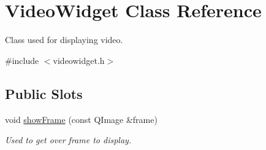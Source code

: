\hypertarget{class_video_widget}{
\section{VideoWidget Class Reference}
\label{db/df7/class_video_widget}
}


Class used for displaying video.  




{\ttfamily \#include $<$videowidget.h$>$}

\subsection*{Public Slots}
\begin{DoxyCompactItemize}
\item 
void \hyperlink{class_video_widget_a9b0e926e4ed31a04cfeee3d086e0d332}{showFrame} (const QImage \&frame)
\begin{DoxyCompactList}\small\item\em Used to get over frame to display. \item\end{DoxyCompactList}\end{DoxyCompactItemize}
